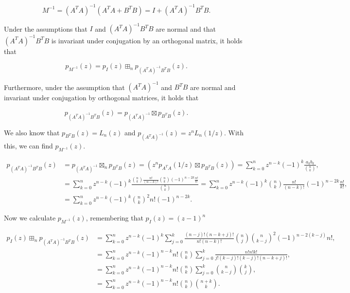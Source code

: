 \begin{equation*}
    M^{-1} = (A^TA)^{-1}(A^TA + B^TB) = I + (A^TA)^{-1}B^TB.
\end{equation*}

Under the assumptions that \( I \) and \( (A^TA)^{-1}B^TB \) are normal and that \( (A^TA)^{-1}B^TB \) is invariant under conjugation by an orthogonal matrix, it holds that

\begin{equation*}
    p_{M^{-1}}(z) = p_I(z) \boxplus_n p_{(A^TA)^{-1}B^TB}(z).
\end{equation*}

Furthermore, under the assumption that \( (A^TA)^{-1} \) and \( B^TB \) are normal and invariant under conjugation by orthogonal matrices, it holds that

\begin{equation*}
    p_{(A^TA)^{-1}B^TB}(z) = p_{(A^TA)^{-1}} \boxtimes p_{B^TB}(z).
\end{equation*}

We also know that \( p_{B^TB}(z) = L_n(z) \) and \( p_{(A^TA)^{-1}}(z)=z^n L_n(1/z) \). With this, we can find \( p_{M^{-1}}(z) \).

\begin{align*}
    p_{(A^TA)^{-1}B^TB}(z) &= p_{(A^TA)^{-1}} \boxtimes_n p_{B^TB}(z) = (z^n p_{A^T A}(1/z) \boxtimes p_{B^TB}(z)) = \sum_{k=0}^n z^{n-k} (-1)^k \frac{a_kb_k}{\binom{n}{k}},\\ 
    &= \sum_{k=0}^n z^{n-k}(-1)^k \frac{\binom{n}{k}\frac{n!}{(n-k)!}\binom{n}{k}(-1)^{n-2k}\frac{n!}{k!}}{\binom{n}{k}} = \sum_{k=0}^n z^{n-k}(-1)^k \binom{n}{k}\frac{n!}{(n-k)!}(-1)^{n-2k}\frac{n!}{k!},\\
    &= \sum_{k=0}^n z^{n-k}(-1)^k \binom{n}{k}^2 n! (-1)^{n-2k}.
\end{align*}

Now we calculate \( p_{M^{-1}}(z) \), remembering that \( p_I(z) = (z-1)^n \)

\begin{align*}
    p_I(z) \boxplus_n p_{(A^TA)^{-1}B^TB}(z) &= \sum_{k=0}^n z^{n-k}(-1)^k \sum_{j=0}^k \frac{(n-j)!(n-k+j)!}{n!(n-k)!}\binom{n}{j}\binom{n}{k-j}^2(-1)^{n-2(k-j)}n!,\\ 
    &= \sum_{k=0}^n z^{n-k}(-1)^{n-k}n!\binom{n}{k} \sum_{j=0}^k \frac{n!n!k!}{j!(k-j)!(k-j)!(n-k+j)!},\\ 
    &= \sum_{k=0}^n z^{n-k}(-1)^{n-k}n!\binom{n}{k} \sum_{j=0}^k \binom{n}{k-j}\binom{k}{j},\\  
    &= \sum_{k=0}^n z^{n-k}(-1)^{n-k}n!\binom{n}{k} \binom{n+k}{k}.
\end{align*}

